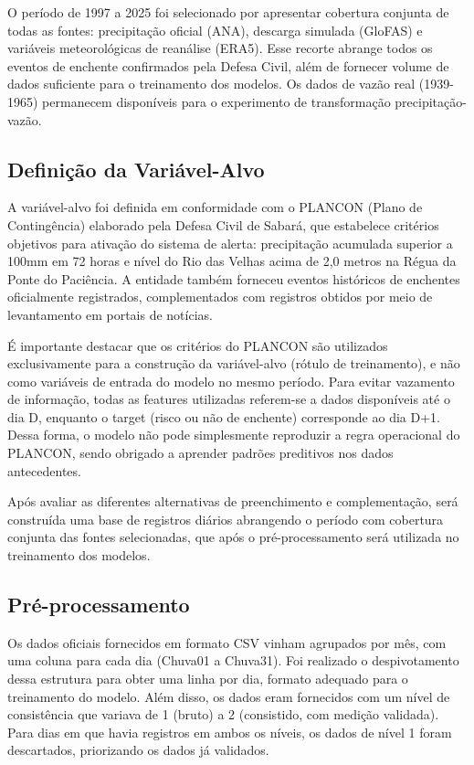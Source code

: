 \documentclass[12pt]{article}
\begin{document}
O período de 1997 a 2025 foi selecionado por apresentar cobertura conjunta de todas as fontes: precipitação oficial (ANA), descarga simulada (GloFAS) e variáveis meteorológicas de reanálise (ERA5). Esse recorte abrange todos os eventos de enchente confirmados pela Defesa Civil, além de fornecer volume de dados suficiente para o treinamento dos modelos. Os dados de vazão real (1939-1965) permanecem disponíveis para o experimento de transformação precipitação-vazão.

\subsection{Definição da Variável-Alvo}

A variável-alvo foi definida em conformidade com o PLANCON (Plano de Contingência) elaborado pela Defesa Civil de Sabará, que estabelece critérios objetivos para ativação do sistema de alerta: precipitação acumulada superior a 100mm em 72 horas e nível do Rio das Velhas acima de 2,0 metros na Régua da Ponte do Paciência. A entidade também forneceu eventos históricos de enchentes oficialmente registrados, complementados com registros obtidos por meio de levantamento em portais de notícias.

É importante destacar que os critérios do PLANCON são utilizados exclusivamente para a construção da variável-alvo (rótulo de treinamento), e não como variáveis de entrada do modelo no mesmo período. Para evitar vazamento de informação, todas as features utilizadas referem-se a dados disponíveis até o dia D, enquanto o target (risco ou não de enchente) corresponde ao dia D+1. Dessa forma, o modelo não pode simplesmente reproduzir a regra operacional do PLANCON, sendo obrigado a aprender padrões preditivos nos dados antecedentes.

Após avaliar as diferentes alternativas de preenchimento e complementação, será construída uma base de registros diários abrangendo o período com cobertura conjunta das fontes selecionadas, que após o pré-processamento será utilizada no treinamento dos modelos.

\subsection{Pré-processamento}

Os dados oficiais fornecidos em formato CSV vinham agrupados por mês, com uma coluna para cada dia (Chuva01 a Chuva31). Foi realizado o despivotamento dessa estrutura para obter uma linha por dia, formato adequado para o treinamento do modelo. Além disso, os dados eram fornecidos com um nível de consistência que variava de 1 (bruto) a 2 (consistido, com medição validada). Para dias em que havia registros em ambos os níveis, os dados de nível 1 foram descartados, priorizando os dados já validados.
\end{document}
